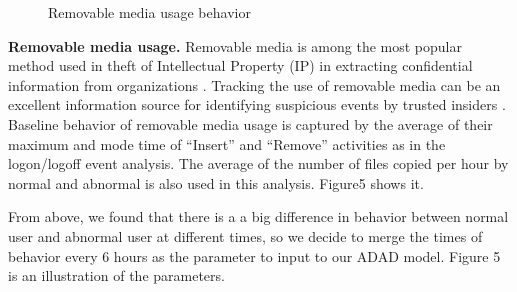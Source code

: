 \documentclass[conference]{IEEEtran}
\begin{document}
\begin{figure}[!t]
\centering
{} 
\caption{ Removable media usage behavior }
\label{fig5}
\end{figure}

\textbf{Removable media usage.}
Removable media is among the most popular method used in theft of Intellectual Property (IP) in extracting confidential information from organizations \cite{b41}. Tracking the use of removable media can be an excellent information source for identifying suspicious events by trusted insiders . Baseline behavior of removable media usage is captured by the average of their maximum and mode time of “Insert” and “Remove” activities as in the logon/logoff event analysis. The average of the number of files copied per hour by normal and abnormal is also used in this analysis. Figure5 shows it. 

From above, we found that there is a a big difference in behavior between normal user and abnormal user at different times, so we decide to merge the times of behavior every 6 hours as the parameter to input to our ADAD model. Figure 5 is an illustration of the parameters.
\end{document}
